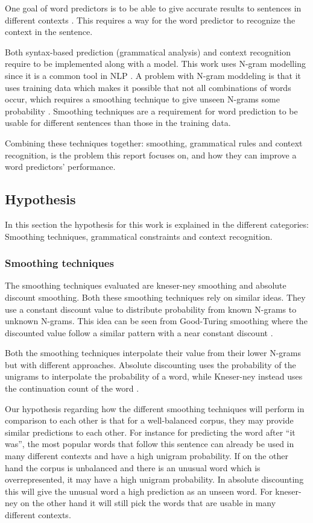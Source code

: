 One goal of word predictors is to be able to give accurate results to sentences in different contexts \cite{DBLP:journals/corr/cs-CL-0009027}. This requires a way for the word predictor to recognize the context in the sentence.
 
Both syntax-based prediction (grammatical analysis) and context recognition require to be implemented along with a model. This work uses N-gram modelling since it is a common tool in NLP \cite{Wandmacher}. A problem with N-gram moddeling is that it uses training data which makes it possible that not all combinations of words occur, which requires a smoothing technique to give unseen N-grams some probability \cite{Russel}. Smoothing techniques are a requirement for word prediction to be usable for different sentences than those in the training data.
 
Combining  these techniques together: smoothing, grammatical rules and context recognition, is the problem this report focuses on, and how they can improve a word predictors' performance.

\subsection{Hypothesis}
In this section the hypothesis for this work is explained in the different categories: Smoothing techniques, grammatical constraints and context recognition.
\subsubsection{Smoothing techniques}
The smoothing techniques evaluated are kneser-ney smoothing and absolute discount smoothing. Both these smoothing techniques rely on similar ideas. They use a constant discount value to distribute probability from known N-grams to unknown N-grams. This idea can be seen from Good-Turing smoothing where the discounted value follow a similar pattern with a near constant discount \cite{coursera}.

Both the smoothing techniques interpolate their value from their lower N-grams but with different approaches. Absolute discounting uses the probability of the unigrams to interpolate the probability of a word, while Kneser-ney instead uses the continuation count of the word \cite{coursera}.

Our hypothesis regarding how the different smoothing techniques will perform in comparison to each other is that for a well-balanced corpus, they may provide similar predictions to each other. For instance for predicting the word after “it was”, the most popular words that follow this sentence can already be used in many different contexts and have a high unigram probability. If on the other hand the corpus is unbalanced and there is an unusual word which is overrepresented, it may have a high unigram probability. In absolute discounting this will give the unusual word a high prediction as an unseen word. For kneser-ney on the other hand it will still pick the words that are usable in many different contexts.

